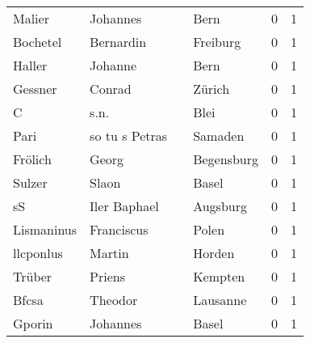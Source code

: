 \documentclass[10pt,a4paper,landscape]{article}
\begin{document}
\begin{longtable}{llllrr}
                   Malier &                           Johannes &             &                                        Bern &          0 &         1 \\
                 Bochetel &                          Bernardin &             &                                    Freiburg &          0 &         1 \\
                   Haller &                            Johanne &             &                                        Bern &          0 &         1 \\
                  Gessner &                             Conrad &             &                                      Zürich &          0 &         1 \\
                        C &                               s.n. &             &                                        Blei &          0 &         1 \\
                     Pari &                     so tu s Petras &             &                                     Samaden &          0 &         1 \\
                  Frölich &                              Georg &             &                                  Begensburg &          0 &         1 \\
                   Sulzer &                              Slaon &             &                                       Basel &          0 &         1 \\
                       sS &                       Iler Baphael &             &                                    Augsburg &          0 &         1 \\
               Lismaninus &                         Franciscus &             &                                       Polen &          0 &         1 \\
                llcponlus &                             Martin &             &                                      Horden &          0 &         1 \\
                   Trüber &                             Priens &             &                                     Kempten &          0 &         1 \\
                    Bfcsa &                            Theodor &             &                                    Lausanne &          0 &         1 \\
                   Gporin &                           Johannes &             &                                       Basel &          0 &         1 \\

\end{longtable}
\end{document}
